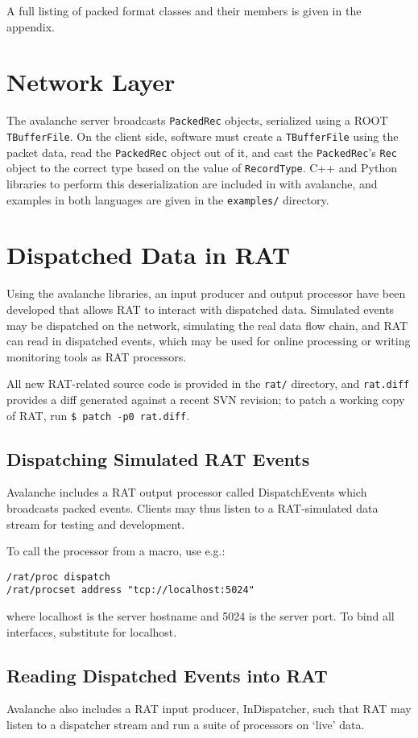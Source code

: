 \documentclass{article}
\begin{document}
A full listing of packed format classes and their members is given in the appendix.

\section{Network Layer}
The avalanche server broadcasts {\tt PackedRec} objects, serialized using a ROOT {\tt TBufferFile}. On the client side, software must create a {\tt TBufferFile} using the packet data, read the {\tt PackedRec} object out of it, and cast the {\tt PackedRec}'s {\tt Rec} object to the correct type based on the value of {\tt RecordType}. C++ and Python libraries to perform this deserialization are included in with avalanche, and examples in both languages are given in the {\tt examples/} directory.

\section{Dispatched Data in RAT}
Using the avalanche libraries, an input producer and output processor have been developed that allows RAT to interact with dispatched data. Simulated events may be dispatched on the network, simulating the real data flow chain, and RAT can read in dispatched events, which may be used for online processing or writing monitoring tools as RAT processors.

All new RAT-related source code is provided in the {\tt rat/} directory, and {\tt rat.diff} provides a diff generated against a recent SVN revision; to patch a working copy of RAT, run {\tt \$ patch -p0 rat.diff}.

\subsection{Dispatching Simulated RAT Events}
Avalanche includes a RAT output processor called DispatchEvents which broadcasts packed events. Clients may thus listen to a RAT-simulated data stream for testing and development.

To call the processor from a macro, use e.g.:
\begin{verbatim}
/rat/proc dispatch
/rat/procset address "tcp://localhost:5024"
\end{verbatim}
where localhost is the server hostname and 5024 is the server port. To bind all interfaces, substitute {\tt *} for localhost.

\subsection{Reading Dispatched Events into RAT}
Avalanche also includes a RAT input producer, InDispatcher, such that RAT may listen to a dispatcher stream and run a suite of processors on `live' data.
\end{document}
